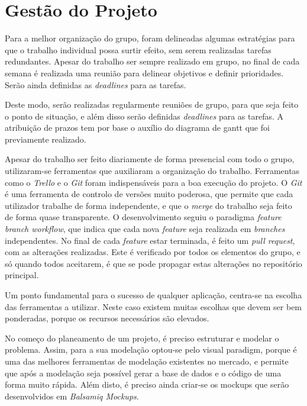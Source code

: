 \section{Gestão do Projeto}

Para a melhor organização do grupo, foram delineadas algumas estratégias para que o trabalho individual possa surtir efeito, sem serem realizadas tarefas redundantes. Apesar do trabalho ser sempre realizado em grupo, no final de cada semana é realizada uma reunião para delinear objetivos e definir prioridades. Serão ainda definidas as \textit{deadlines} para as tarefas.

Deste modo, serão realizadas regularmente reuniões de grupo, para que seja feito o ponto de situação, e além disso serão definidas \textit{deadlines} para as tarefas. A atribuição de prazos tem por base o auxílio do diagrama de gantt que foi previamente realizado.

Apesar do trabalho ser feito diariamente de forma presencial com todo o grupo, utilizaram-se ferramentas que auxiliaram a organização do trabalho. Ferramentas como o \textit{Trello} e o \textit{Git} foram indispensáveis para a boa execução do projeto. O \textit{Git} é uma ferramenta de controlo de versões muito poderosa, que permite que cada utilizador trabalhe de forma independente, e que o \textit{merge} do trabalho seja feito de forma quase transparente.
O desenvolvimento seguiu o paradigma \textit{feature branch workflow}, que indica que cada nova \textit{feature} seja realizada em \textit{branches} independentes. No final de cada \textit{feature} estar terminada, é feito um \textit{pull request}, com as alterações realizadas. Este é verificado por todos os elementos do grupo, e só quando todos aceitarem, é que se pode propagar estas alterações no repositório principal.

Um ponto fundamental para o sucesso de qualquer aplicação, centra-se na escolha das ferramentas a utilizar. Neste caso existem muitas escolhas que devem ser bem ponderadas, porque os recursos necessários são elevados.

No começo do planeamento de um projeto, é preciso estruturar e modelar o problema. Assim, para a sua modelação optou-se pelo visual paradigm, porque é uma das melhores ferramentas de modelação existentes no mercado, e permite que após a modelação seja possível gerar a base de dados e o código de uma forma muito rápida. Além disto, é preciso ainda criar-se os mockups que serão desenvolvidos em \textit{Balsamiq Mockups}.

